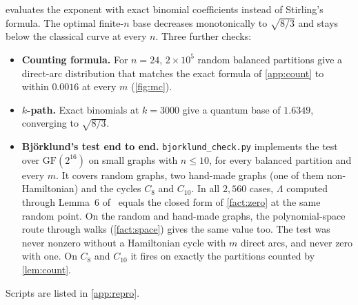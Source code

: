 \documentclass[11pt,a4paper]{article}
\theoremstyle{plain}
\theoremstyle{remark}
\newcommand{\GF}{\mathrm{GF}}
\begin{document}
 evaluates the exponent with exact binomial coefficients instead of Stirling's formula. The optimal finite-$n$ base decreases monotonically to $\sqrt{8/3}$ and stays below the classical curve at every $n$. Three further checks:
\begin{itemize}[nosep]
  \item \textbf{Counting formula.} For $n = 24$, $2\times 10^5$ random balanced partitions give a direct-arc distribution that matches the exact formula of \cref{app:count} to within $0.0016$ at every $m$ (\cref{fig:mc}).
  \item \textbf{$k$-path.} Exact binomials at $k = 3000$ give a quantum base of $1.6349$, converging to $\sqrt{8/3}$.
  \item \textbf{Björklund's test end to end.} \texttt{bjorklund\_check.py} implements the test over $\GF(2^{16})$ on small graphs with $n \le 10$, for every balanced partition and every $m$. It covers random graphs, two hand-made graphs (one of them non-Hamiltonian) and the cycles $C_8$ and $C_{10}$. In all $2{,}560$ cases, $\Lambda$ computed through Lemma~6 of~\cite{bjorklund} equals the closed form of \cref{fact:zero} at the same random point. On the random and hand-made graphs, the polynomial-space route through walks (\cref{fact:space}) gives the same value too. The test was never nonzero without a Hamiltonian cycle with $m$ direct arcs, and never zero with one. On $C_8$ and $C_{10}$ it fires on exactly the partitions counted by \cref{lem:count}.
\end{itemize}
Scripts are listed in \cref{app:repro}.
\end{document}
